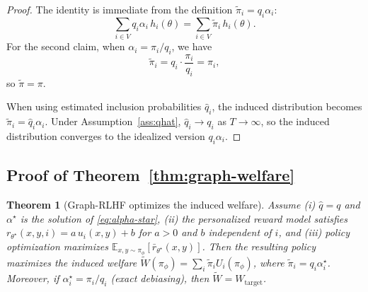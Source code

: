 \documentclass{article}
\newtheorem*{theorem*}{Theorem}
\theoremstyle{plain}
\theoremstyle{definition}
\theoremstyle{remark}
\begin{document}
\begin{proof}
The identity is immediate from the definition $\tilde\pi_i = q_i \alpha_i$:
\begin{equation}
    \sum_{i \in V} q_i \alpha_i \, h_i(\theta)
    =
    \sum_{i \in V} \tilde\pi_i \, h_i(\theta).
\end{equation}
For the second claim, when $\alpha_i = \pi_i / q_i$, we have
\begin{equation}
    \tilde\pi_i = q_i \cdot \frac{\pi_i}{q_i} = \pi_i,
\end{equation}
so $\tilde\pi = \pi$.

When using estimated inclusion probabilities $\hat q_i$, the induced
distribution becomes $\tilde\pi_i = \hat q_i \alpha_i$. Under
Assumption~\ref{ass:qhat}, $\hat q_i \to q_i$ as $T \to \infty$, so the
induced distribution converges to the idealized version $q_i \alpha_i$.
\end{proof}

\subsection{Proof of Theorem~\ref{thm:graph-welfare}}
\label{app:proof-graph-welfare}

\begin{theorem*}[Graph-RLHF optimizes the induced welfare]
Assume (i) $\hat q = q$ and $\alpha^\star$ is the solution of
\eqref{eq:alpha-star}, (ii) the personalized reward model satisfies
$r_{\theta^\star}(x,y,i) = a \, u_i(x,y) + b$ for $a > 0$ and $b$ independent
of $i$, and (iii) policy optimization maximizes
$\mathbb{E}_{x,y \sim \pi_\phi}[\bar r_{\theta^\star}(x,y)]$.
Then the resulting policy maximizes the induced welfare
$\widetilde{W}(\pi_\phi) = \sum_i \tilde\pi_i U_i(\pi_\phi)$, where
$\tilde\pi_i = q_i \alpha_i^\star$. Moreover, if
$\alpha_i^\star = \pi_i / q_i$ (exact debiasing), then
$\widetilde{W} = W_{\text{target}}$.
\end{theorem*}
\end{document}
